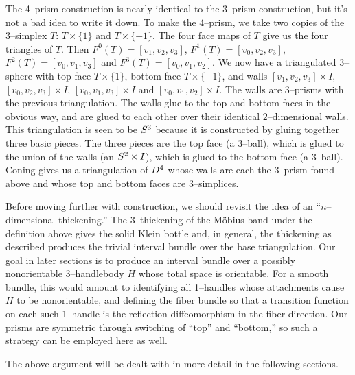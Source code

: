 The 4--prism construction is nearly identical to the 3--prism construction, but it's not a bad idea to write it down.
To make the 4--prism, we take two copies of the 3--simplex $T$: $T\times\{1\}$ and $T\times\{-1\}$.
The four face maps of $T$ give us the four triangles of $T$.
Then $F^0(T)=[v_1,v_2,v_3]$, $F^1(T)=[v_0,v_2,v_3]$, $F^2(T)=[v_0,v_1,v_3]$ and $F^3(T)=[v_0,v_1,v_2]$.
We now have a triangulated 3--sphere with top face $T\times\{1\}$, bottom face $T\times\{-1\}$, and walls $[v_1,v_2,v_3]\times I$, $[v_0,v_2,v_3]\times I$, $[v_0,v_1,v_3]\times I$ and $[v_0,v_1,v_2]\times I$.
The walls are 3--prisms with the previous triangulation.
The walls glue to the top and bottom faces in the obvious way, and are glued to each other over their identical $2$--dimensional walls.
This triangulation is seen to be $S^3$ because it is constructed by gluing together three basic pieces.
The three pieces are the top face (a 3--ball), which is glued to the union of the walls (an $S^2\times I$), which is glued to the bottom face (a 3--ball).
Coning gives us a triangulation of $D^4$ whose walls are each the 3--prism found above and whose top and bottom faces are 3--simplices.

\begin{rmk} 
  Before moving further with construction, we should revisit the idea of an ``$n$--dimensional thickening.''
  The 3--thickening of the M\"obius band under the definition above gives the solid Klein bottle and, in general, the thickening as described produces the trivial interval bundle over the base triangulation.
  Our goal in later sections is to produce an interval bundle over a possibly nonorientable 3--handlebody $H$ whose total space is orientable.
  For a smooth bundle, this would amount to identifying all 1--handles whose attachments cause $H$ to be nonorientable, and defining the fiber bundle so that a transition function on each such 1--handle is the reflection diffeomorphism in the fiber direction.
  Our prisms are symmetric through switching of ``top'' and ``bottom,'' so such a strategy can be employed here as well.
\end{rmk}

The above argument will be dealt with in more detail in the following sections.
